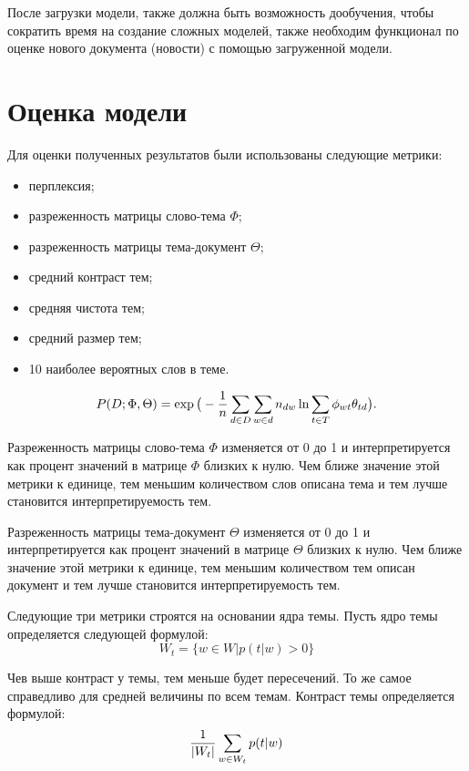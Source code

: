 После загрузки модели, также должна быть возможность дообучения, чтобы сократить время на создание сложных моделей, также необходим функционал по оценке нового документа (новости) с помощью загруженной модели.
%
\section{Оценка модели}

Для оценки полученных результатов были использованы следующие метрики:

\begin{itemize}
    \item перплексия;
    \item разреженность матрицы слово-тема $\Phi$;
    \item разреженность матрицы тема-документ $\Theta$;
    \item средний контраст тем;
    \item средняя чистота тем;
    \item средний размер тем;
    \item 10 наиболее вероятных слов в теме.
\end{itemize}

$$
P(D;\Phi,\Theta) = \exp{\big( 
    -{{1}\over{n}} \sum_{d \in D}{
        \sum_{w \in d}{
            n_{dw} \ln{
                \sum_{t \in T}{
                    \phi_{wt} \theta_{td}
                }
            }
        }
    } 
\big)}.
$$

Разреженность матрицы слово-тема $\Phi$ изменяется от 0 до 1 и интерпретируется как процент значений в матрице $\Phi$ близких к нулю. Чем ближе значение этой метрики к единице, тем меньшим количеством слов описана тема и тем лучше становится интерпретируемость тем.

Разреженность матрицы тема-документ $\Theta$ изменяется от 0 до 1 и интерпретируется как процент значений в матрице $\Theta$ близких к нулю. Чем ближе значение этой метрики к единице, тем меньшим количеством тем описан документ и тем лучше становится интерпретируемость тем.

Следующие три метрики строятся на основании ядра темы. Пусть ядро темы определяется следующей формулой:
$$
W_t = \{
    w \in W|p(t|w) > 0
\}
$$

Чев выше контраст у темы, тем меньше будет пересечений. То же самое справедливо для средней величины по всем темам. Контраст темы определяется формулой:
$$
{{1}\over{|W_t|}}\sum_{w \in W_t}{
    p(t|w)
}
$$

